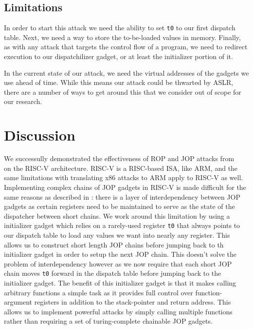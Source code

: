 
\subsection{Limitations}

In order to start this attack we need the ability to set \verb|t0| to our first
dispatch table. Next, we need a way to store the to-be-loaded values in memory.
Finally, as with any attack that targets the control flow of a program, we need
to redirect execution to our dispatchilizer gadget, or at least the initializer
portion of it.

In the current state of our attack, we need the virtual addresses of the
gadgets we use ahead of time. While this means our attack could be thwarted by
ASLR, there are a number of ways to get around this that we consider out of
scope for our research.



\section{Discussion}

We successully demonstrated the effectiveness of ROP and JOP attacks from
~\cite{checkoway10ropnoret,bletsch11jopx86,sadeghi15tinyjop} on the RISC-V
architecture. RISC-V is a RISC-based ISA, like ARM, and the same limitations
with translating x86 attacks to ARM apply to RISC-V as well. Implementing
complex chains of JOP gadgets in RISC-V is made difficult for the same reasons
as described in \cite{bletsch11jopx86}: there is a layer of interdependency
between JOP gadgets as certain registers need to be maintained to serve as the
state of the dispatcher between short chains. We work around this limitation
by using a initializer gadget which relies on a rarely-used register \verb|t0|
that always points to our dispatch table to load any values we want into nearly
any register. This allows us to construct short length JOP chains before
jumping back to th initializer gadget in order to setup the next JOP chain.
This doesn't solve the problem of interdependency however as we now require
that each short JOP chain moves \verb|t0| forward in the dispatch table before
jumping back to the initializer gadget. The benefit of this initializer
gadget is that it makes calling arbitrary functions a simple task as it provides
full control over function-argument registers in addition to the stack-pointer and
return address. This allows us to implement powerful attacks by simply calling
multiple functions rather than requiring a set of turing-complete chainable JOP gadgets.

